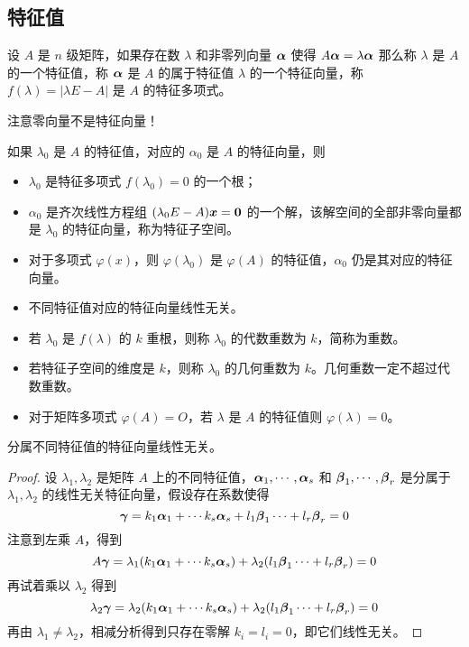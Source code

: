 \subsection{特征值}

\begin{definition}
	设 $A$ 是 $n$ 级矩阵，如果存在数 $\lambda$ 和非零列向量 $\boldsymbol{\alpha}$ 使得 $A \boldsymbol{\alpha} = \lambda\boldsymbol{\alpha}$ 那么称 $\lambda$ 是 $A$ 的一个特征值，称 $\boldsymbol{\alpha}$ 是 $A$ 的属于特征值 $\lambda$ 的一个特征向量，称 $f(\lambda) = |\lambda E - A|$ 是 $A$ 的特征多项式。
\end{definition}

\begin{note}
	注意零向量不是特征向量！
\end{note}

如果 $\lambda_0$ 是 $A$ 的特征值，对应的 $\alpha_0$ 是 $A$ 的特征向量，则
\begin{itemize}
	\item $\lambda_0$ 是特征多项式 $f(\lambda_0) = 0$ 的一个根；
	\item $\alpha_0$ 是齐次线性方程组 $(\lambda_0 E - A) \boldsymbol{x} = \boldsymbol{0}$ 的一个解，该解空间的全部非零向量都是 $\lambda_0$ 的特征向量，称为特征子空间。
	\item 对于多项式 $\varphi(x)$，则 $\varphi(\lambda_0)$ 是 $\varphi(A)$ 的特征值，$\alpha_0$ 仍是其对应的特征向量。
	\item 不同特征值对应的特征向量线性无关。
	\item 若 $\lambda_0$ 是 $f(\lambda)$ 的 $k$ 重根，则称 $\lambda_0$ 的代数重数为 $k$，简称为重数。
	\item 若特征子空间的维度是 $k$，则称 $\lambda_0$ 的几何重数为 $k$。几何重数一定不超过代数重数。
	\item 对于矩阵多项式 $\varphi(A) = O$，若 $\lambda$ 是 $A$ 的特征值则 $\varphi(\lambda) = 0$。
\end{itemize}

\begin{theorem}
	分属不同特征值的特征向量线性无关。
\end{theorem}

\begin{proof}
	设 $\lambda_1, \lambda_2$ 是矩阵 $A$ 上的不同特征值，$\boldsymbol{\alpha}_1,\cdots,\boldsymbol{\alpha}_s$ 和 $\boldsymbol{\beta}_1,\cdots,\boldsymbol{\beta}_r$ 是分属于 $\lambda_1, \lambda_2$ 的线性无关特征向量，假设存在系数使得
	\[ \boldsymbol{\gamma} = k_1\boldsymbol{\alpha}_1 + \cdots k_{s}\boldsymbol{\alpha}_s + l_1\boldsymbol{\beta}_1 \cdots + l_r\boldsymbol{\beta}_r = 0 \]
	注意到左乘 $A$，得到
	\[ A \boldsymbol{\gamma} = \lambda_1(k_1\boldsymbol{\alpha}_1 + \cdots k_{s}\boldsymbol{\alpha}_s) + \lambda_2(l_1\boldsymbol{\beta}_1 \cdots + l_r\boldsymbol{\beta}_r) = 0 \]
	再试着乘以 $\lambda_2$ 得到
	\[ \lambda_2 \boldsymbol{\gamma} = \lambda_2(k_1\boldsymbol{\alpha}_1 + \cdots k_{s}\boldsymbol{\alpha}_s) + \lambda_2(l_1\boldsymbol{\beta}_1 \cdots + l_r\boldsymbol{\beta}_r) = 0 \]
	再由 $\lambda_1 \neq \lambda_2$，相减分析得到只存在零解 $k_i = l_i = 0$，即它们线性无关。
\end{proof}

